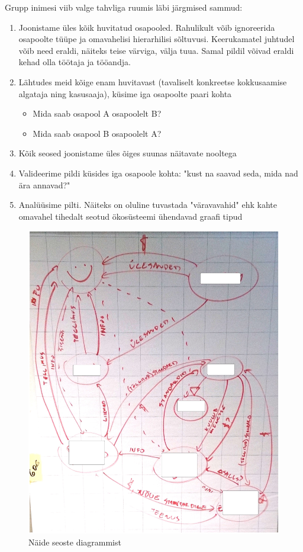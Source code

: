\documentclass{tufte-book}
\begin{document}
Grupp inimesi viib valge tahvliga ruumis läbi järgmised sammud:
\begin{enumerate}
	\item Joonistame üles kõik huvitatud osapooled. Rahulikult võib ignoreerida osapoolte tüüpe ja omavahelisi hierarhilisi sõltuvusi. Keerukamatel juhtudel võib need eraldi, näiteks teise värviga, välja tuua. Samal pildil võivad eraldi kehad olla töötaja ja tööandja. 
	\item Lähtudes meid kõige enam huvitavast (tavaliselt konkreetse kokkusaamise algataja ning kasusaaja), küsime iga osapoolte paari kohta
		\begin{itemize}
			\item Mida saab osapool A osapoolelt B?
			\item Mida saab osapool B osapoolelt A?
		\end{itemize}
	\item Kõik seosed joonistame üles õiges suunas näitavate nooltega 
	\item Valideerime pildi küsides iga osapoole kohta: "kust na saavad seda, mida nad ära annavad?"
	\item Analüüsime pilti. Näiteks on oluline tuvastada "väravavahid" ehk kahte omavahel tihedalt seotud ökosüsteemi ühendavad graafi tipud
\end{enumerate}

\begin{figure}[h]
	\begin{center}
		\includegraphics[width=.6\textwidth]{seosed.jpg}
		\caption{Näide seoste diagrammist}
		\label{fig:seosed}
	\end{center}
\end{figure}
\end{document}
